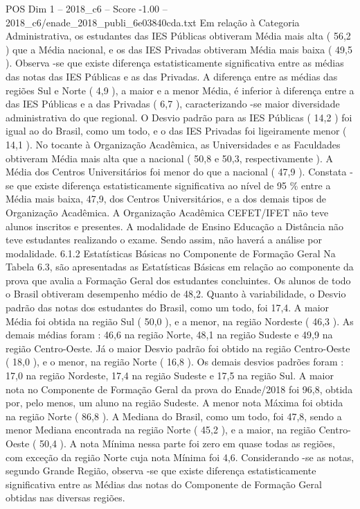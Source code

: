 \begin{textsample}{POS Dim 1 – 2018\_c6 – Score -1.00 – 2018\_c6/enade\_2018\_publi\_6e03840cda.txt}
Em relação à Categoria Administrativa, os estudantes das IES Públicas obtiveram Média mais alta ( 56,2 ) que a Média nacional, e os das IES Privadas obtiveram Média mais baixa ( 49,5 ).
Observa -se que existe diferença estatisticamente significativa entre as médias das notas das IES Públicas e as das Privadas.
A diferença entre as médias das regiões Sul e Norte ( 4,9 ), a maior e a menor Média, é inferior à diferença entre a das IES Públicas e a das Privadas ( 6,7 ), caracterizando -se maior diversidade administrativa do que regional.
O Desvio padrão para as IES Públicas ( 14,2 ) foi igual ao do Brasil, como um todo, e o das IES Privadas foi ligeiramente menor ( 14,1 ).
No tocante à Organização Acadêmica, as Universidades e as Faculdades obtiveram Média mais alta que a nacional ( 50,8 e 50,3, respectivamente ).
A Média dos Centros Universitários foi menor do que a nacional ( 47,9 ).
Constata -se que existe diferença estatisticamente significativa ao nível de 95 \% entre a Média mais baixa, 47,9, dos Centros Universitários, e a dos demais tipos de Organização Acadêmica.
A Organização Acadêmica CEFET/IFET não teve alunos inscritos e presentes.
A modalidade de Ensino Educação a Distância não teve estudantes realizando o exame.
Sendo assim, não haverá a análise por modalidade. 6.1.2 Estatísticas Básicas no Componente de Formação Geral Na Tabela 6.3, são apresentadas as Estatísticas Básicas em relação ao componente da prova que avalia a Formação Geral dos estudantes concluintes.
Os alunos de todo o Brasil obtiveram desempenho médio de 48,2.
Quanto à variabilidade, o Desvio padrão das notas dos estudantes do Brasil, como um todo, foi 17,4.
A maior Média foi obtida na região Sul ( 50,0 ), e a menor, na região Nordeste ( 46,3 ).
As demais médias foram : 46,6 na região Norte, 48,1 na região Sudeste e 49,9 na região Centro-Oeste.
Já o maior Desvio padrão foi obtido na região Centro-Oeste ( 18,0 ), e o menor, na região Norte ( 16,8 ).
Os demais desvios padrões foram : 17,0 na região Nordeste, 17,4 na região Sudeste e 17,5 na região Sul.
A maior nota no Componente de Formação Geral da prova do Enade/2018 foi 96,8, obtida por, pelo menos, um aluno na região Sudeste.
A menor nota Máxima foi obtida na região Norte ( 86,8 ).
A Mediana do Brasil, como um todo, foi 47,8, sendo a menor Mediana encontrada na região Norte ( 45,2 ), e a maior, na região Centro-Oeste ( 50,4 ).
A nota Mínima nessa parte foi zero em quase todas as regiões, com exceção da região Norte cuja nota Mínima foi 4,6.
Considerando -se as notas, segundo Grande Região, observa -se que existe diferença estatisticamente significativa entre as Médias das notas do Componente de Formação Geral obtidas nas diversas regiões.

\end{textsample}
